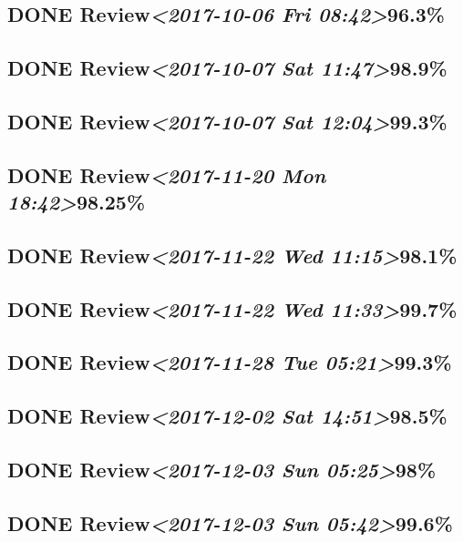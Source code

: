 \documentclass[11pt]{ctexart}
\begin{document}
\subsection{{\bfseries\sffamily DONE} Review\textit{<2017-10-06 Fri 08:42>}96.3\%}
\label{sec:org34d2e7f}
\subsection{{\bfseries\sffamily DONE} Review\textit{<2017-10-07 Sat 11:47>}98.9\%}
\label{sec:org529ec93}
\subsection{{\bfseries\sffamily DONE} Review\textit{<2017-10-07 Sat 12:04>}99.3\%}
\label{sec:org7ce05f2}

\subsection{{\bfseries\sffamily DONE} Review\textit{<2017-11-20 Mon 18:42>}98.25\%}
\label{sec:org17728da}
\subsection{{\bfseries\sffamily DONE} Review\textit{<2017-11-22 Wed 11:15>}98.1\%}
\label{sec:orga4df4bb}
\subsection{{\bfseries\sffamily DONE} Review\textit{<2017-11-22 Wed 11:33>}99.7\%}
\label{sec:orgb1bb980}
\subsection{{\bfseries\sffamily DONE} Review\textit{<2017-11-28 Tue 05:21>}99.3\%}
\label{sec:org9cb2e09}
\subsection{{\bfseries\sffamily DONE} Review\textit{<2017-12-02 Sat 14:51>}98.5\%}
\label{sec:org82bfaa5}
\subsection{{\bfseries\sffamily DONE} Review\textit{<2017-12-03 Sun 05:25>}98\%}
\label{sec:org44ec3c5}
\subsection{{\bfseries\sffamily DONE} Review\textit{<2017-12-03 Sun 05:42>}99.6\%}
\label{sec:org734056a}
\end{document}
